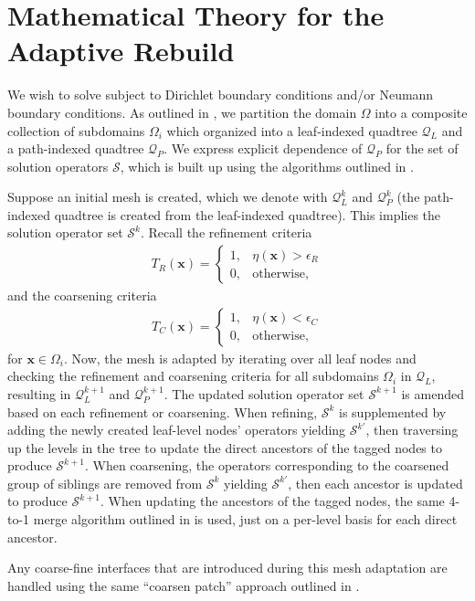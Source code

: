 \section{Mathematical Theory for the Adaptive Rebuild}

We wish to solve  subject to Dirichlet boundary conditions and/or Neumann boundary conditions. As outlined in , we partition the domain $\Omega$ into a composite collection of subdomains $\Omega_i$ which organized into a leaf-indexed quadtree $\mathcal{Q}_{L}$ and a path-indexed quadtree $\mathcal{Q}_{P}$. We express explicit dependence of $\mathcal{Q}_{P}$ for the set of solution operators $\mathcal{S}$, which is built up using the algorithms outlined in .

Suppose an initial mesh is created, which we denote with $\mathcal{Q}^{k}_{L}$ and $\mathcal{Q}^{k}_{P}$ (the path-indexed quadtree is created from the leaf-indexed quadtree). This implies the solution operator set $\mathcal{S}^{k}$. Recall the refinement criteria
\begin{align}
    T_{R} (\textbf{x}) =
    \begin{cases}
        1,& \eta(\textbf{x}) > \epsilon_{R} \\
        0,& \text{otherwise},
    \end{cases}
\end{align}
and the coarsening criteria
\begin{align}
    T_{C} (\textbf{x}) =
    \begin{cases}
        1,& \eta(\textbf{x}) < \epsilon_{C} \\
        0,& \text{otherwise},
    \end{cases}
\end{align}
for $\textbf{x} \in \Omega_i$. Now, the mesh is adapted by iterating over all leaf nodes and checking the refinement and coarsening criteria for all subdomains $\Omega_i$ in $\mathcal{Q}_{L}$, resulting in $\mathcal{Q}^{k+1}_{L}$ and $\mathcal{Q}^{k+1}_{P}$. The updated solution operator set $\mathcal{S}^{k+1}$ is amended based on each refinement or coarsening. When refining, $\mathcal{S}^{k}$ is supplemented by adding the newly created leaf-level nodes' operators yielding $\mathcal{S}^{k'}$, then traversing up the levels in the tree to update the direct ancestors of the tagged nodes to produce $\mathcal{S}^{k+1}$. When coarsening, the operators corresponding to the coarsened group of siblings are removed from $\mathcal{S}^{k}$ yielding $\mathcal{S}^{k'}$, then each ancestor is updated to produce $\mathcal{S}^{k+1}$. When updating the ancestors of the tagged nodes, the same 4-to-1 merge algorithm outlined in  is used, just on a per-level basis for each direct ancestor.

Any coarse-fine interfaces that are introduced during this mesh adaptation are handled using the same ``coarsen patch'' approach outlined in .